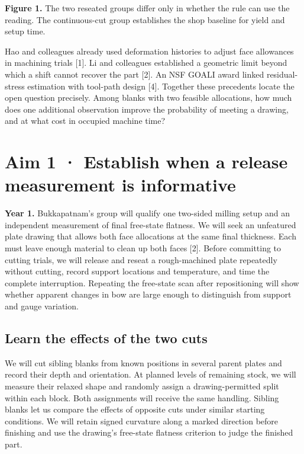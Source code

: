\documentclass[11pt,letterpaper]{article}
\begin{document}
{\small\textbf{Figure 1.} The two reseated groups differ only in whether the rule can use the reading. The continuous-cut group establishes the shop baseline for yield and setup time.}

Hao and colleagues already used deformation histories to adjust face allowances in machining trials [1]. Li and colleagues established a geometric limit beyond which a shift cannot recover the part [2]. An NSF GOALI award linked residual-stress estimation with tool-path design [4]. Together these precedents locate the open question precisely. Among blanks with two feasible allocations, how much does one additional observation improve the probability of meeting a drawing, and at what cost in occupied machine time?

\newpage

\section*{Aim 1 · Establish when a release measurement is informative}

\textbf{Year 1.} Bukkapatnam’s group will qualify one two-sided milling setup and an independent measurement of final free-state flatness. We will seek an unfeatured plate drawing that allows both face allocations at the same final thickness. Each must leave enough material to clean up both faces [2]. Before committing to cutting trials, we will release and reseat a rough-machined plate repeatedly without cutting, record support locations and temperature, and time the complete interruption. Repeating the free-state scan after repositioning will show whether apparent changes in bow are large enough to distinguish from support and gauge variation.

\subsection*{Learn the effects of the two cuts}

We will cut sibling blanks from known positions in several parent plates and record their depth and orientation. At planned levels of remaining stock, we will measure their relaxed shape and randomly assign a drawing-permitted split within each block. Both assignments will receive the same handling. Sibling blanks let us compare the effects of opposite cuts under similar starting conditions. We will retain signed curvature along a marked direction before finishing and use the drawing’s free-state flatness criterion to judge the finished part.
\end{document}
